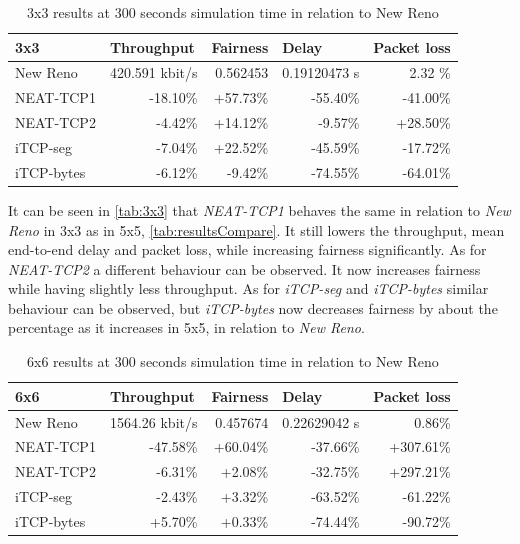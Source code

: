 \begin{table}[htbp]
  \centering
  \caption{3x3 results at 300 seconds simulation time in relation to New Reno}
    \begin{tabular}{|l|r|r|r|r|}\hline
    3x3   & \multicolumn{1}{l|}{Throughput} & \multicolumn{1}{l|}{Fairness} & \multicolumn{1}{l|}{Delay} & \multicolumn{1}{l|}{Packet loss} \\\hline
    New Reno & 420.591 kbit/s & 0.562453 & 0.19120473 s & 2.32 \% \\\hline
    NEAT-TCP1 & -18.10\% & +57.73\% & -55.40\% & -41.00\% \\\hline
    NEAT-TCP2 & -4.42\% & +14.12\% & -9.57\% & +28.50\% \\\hline
    iTCP-seg & -7.04\% & +22.52\% & -45.59\% & -17.72\% \\\hline
    iTCP-bytes & -6.12\% & -9.42\% & -74.55\% & -64.01\% \\\hline
    \end{tabular}%
  \label{tab:3x3}%
\end{table}%
It can be seen in \autoref{tab:3x3} that \textit{NEAT-TCP1} behaves the same in relation to \textit{New Reno} in 3x3 as in 5x5, \autoref{tab:resultsCompare}. It still lowers the throughput, mean end-to-end delay and packet loss, while increasing fairness significantly. As for \textit{NEAT-TCP2} a different behaviour can be observed. It now increases fairness while having slightly less throughput. 
As for \textit{iTCP-seg} and \textit{iTCP-bytes} similar behaviour can be observed, but \textit{iTCP-bytes} now decreases fairness by about the percentage as it increases in 5x5, in relation to \textit{New Reno}.
\begin{table}[htbp]
  \centering
  \caption{6x6 results at 300 seconds simulation time in relation to New Reno}
    \begin{tabular}{|l|r|r|r|r|}\hline
    6x6   & \multicolumn{1}{l|}{Throughput} & \multicolumn{1}{l|}{Fairness} & \multicolumn{1}{l|}{Delay} & \multicolumn{1}{l|}{Packet loss} \\\hline
    New Reno & 1564.26 kbit/s & 0.457674 & 0.22629042 s & 0.86\% \\\hline
    NEAT-TCP1 & -47.58\% & +60.04\% & -37.66\% & +307.61\% \\\hline
    NEAT-TCP2 & -6.31\% & +2.08\% & -32.75\% & +297.21\% \\\hline
    iTCP-seg & -2.43\% & +3.32\% & -63.52\% & -61.22\% \\\hline
    iTCP-bytes & +5.70\% & +0.33\% & -74.44\% & -90.72\% \\\hline
    \end{tabular}%
  \label{tab:6x6}%
\end{table}%
